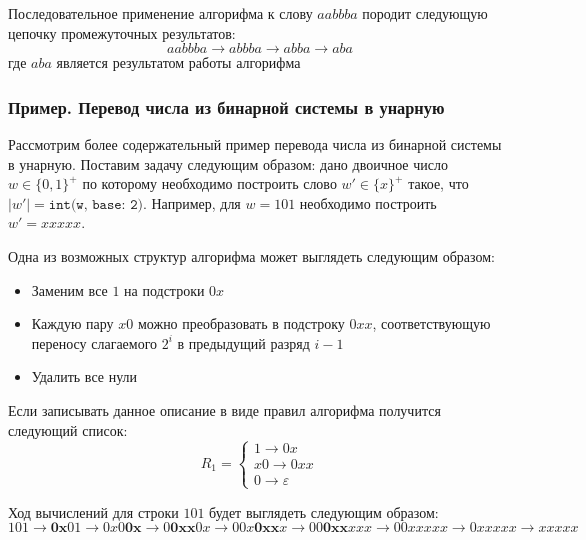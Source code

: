 \documentclass[
    11pt,
    a4paper
]{article}
\theoremstyle{definition}
\begin{document}
Последовательное применение алгорифма к слову $aabbba$ породит следующую цепочку промежуточных результатов:
$$aabbba \rightarrow abbba \rightarrow abba \rightarrow aba$$
где $aba$ является результатом работы алгорифма

\subsubsection{Пример. Перевод числа из бинарной системы в унарную}

Рассмотрим более содержательный пример перевода числа из бинарной системы в унарную. Поставим задачу следующим образом: дано двоичное число $w \in \{0, 1\}^+$ по которому необходимо построить слово $w' \in \{x\}^+$ такое, что $|w'| = \texttt{int(w, base: 2)}$. Например, для $w = 101$ необходимо построить $w' = xxxxx$.

Одна из возможных структур алгорифма может выглядеть следующим образом: 
\begin{itemize}
\item Заменим все $1$ на подстроки $0x$
\item Каждую пару $x0$ можно преобразовать в подстроку $0xx$, соответствующую переносу слагаемого $2^i$ в предыдущий разряд $i-1$
\item Удалить все нули
\end{itemize}

Если записывать данное описание в виде правил алгорифма получится следующий список:
$$R_1 = \begin{cases}1 \rightarrow 0x\\x0 \rightarrow 0xx\\ 0 \rightarrow \varepsilon\end{cases}$$

Ход вычислений для строки $101$ будет выглядеть следующим образом:
$$101 \rightarrow \mathbf{0x}01 \rightarrow 0x0\mathbf{0x} \rightarrow 0\mathbf{0xx}0x \rightarrow 00x\mathbf{0xx}x \rightarrow 00\mathbf{0xx}xxx \rightarrow 00xxxxx \rightarrow 0xxxxx \rightarrow xxxxx$$
\end{document}
